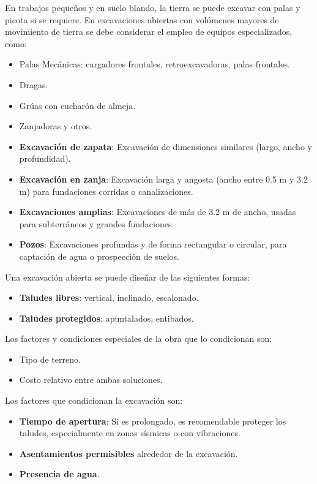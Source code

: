 En trabajos pequeños y en suelo blando, la tierra se puede excavar con palas y picota si se requiere. En excavaciones abiertas con volúmenes mayores de movimiento de tierra se debe considerar el empleo de equipos especializados, como:
\begin{itemize}
    \item Palas Mecánicas: cargadores frontales, retroexcavadoras, palas frontales.
    \item Dragas.
    \item Grúas con cucharón de almeja.
    \item Zanjadoras y otros.
\end{itemize}

\begin{itemize}
    \item \textbf{Excavación de zapata}: Excavación de dimensiones similares (largo, ancho y profundidad).
    \item \textbf{Excavación en zanja}: Excavación larga y angosta (ancho entre 0.5 m y 3.2 m) para fundaciones corridas o canalizaciones.
    \item \textbf{Excavaciones amplias}: Excavaciones de más de 3.2 m de ancho, usadas para subterráneos y grandes fundaciones.
    \item \textbf{Pozos}: Excavaciones profundas y de forma rectangular o circular, para captación de agua o prospección de suelos.
\end{itemize}

Una excavación abierta se puede diseñar de las siguientes formas:
\begin{itemize}
    \item \textbf{Taludes libres}: vertical, inclinado, escalonado.
    \item \textbf{Taludes protegidos}: apuntalados, entibados.
\end{itemize}

Los factores y condiciones especiales de la obra que lo condicionan son:
\begin{itemize}
    \item Tipo de terreno.
    \item Costo relativo entre ambas soluciones.
\end{itemize}

Los factores que condicionan la excavación son:
\begin{itemize}
    \item \textbf{Tiempo de apertura}: Si es prolongado, es recomendable proteger los taludes, especialmente en zonas sísmicas o con vibraciones.
    \item \textbf{Asentamientos permisibles} alrededor de la excavación.
    \item \textbf{Presencia de agua}.
\end{itemize}

